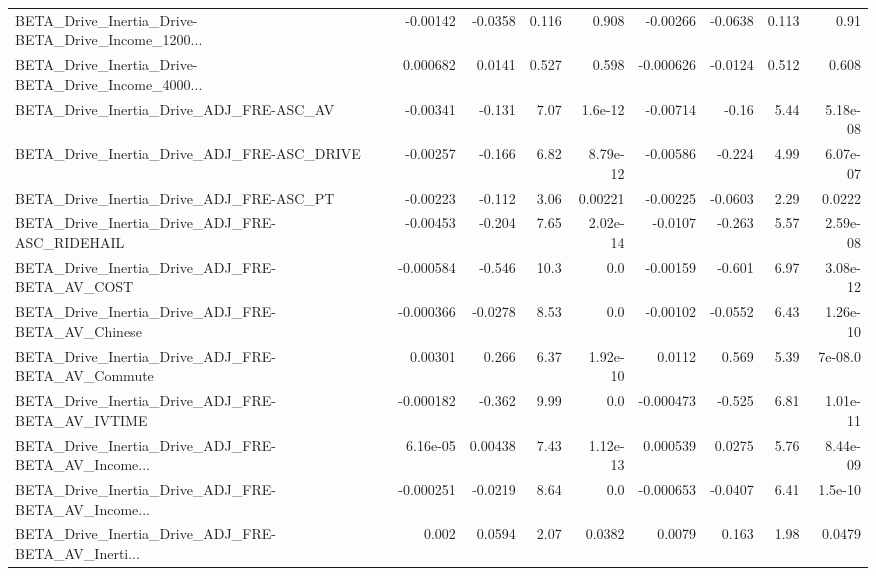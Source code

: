 \begin{tabular}{lrrrrrrrr}
BETA\_Drive\_Inertia\_Drive-BETA\_Drive\_Income\_1200... &    -0.00142 &      -0.0358 &    0.116 &    0.908 &   -0.00266 &     -0.0638 &        0.113 &          0.91 \\
BETA\_Drive\_Inertia\_Drive-BETA\_Drive\_Income\_4000... &    0.000682 &       0.0141 &    0.527 &    0.598 &  -0.000626 &     -0.0124 &        0.512 &         0.608 \\
BETA\_Drive\_Inertia\_Drive\_ADJ\_FRE-ASC\_AV            &    -0.00341 &       -0.131 &     7.07 &  1.6e-12 &   -0.00714 &       -0.16 &         5.44 &      5.18e-08 \\
BETA\_Drive\_Inertia\_Drive\_ADJ\_FRE-ASC\_DRIVE         &    -0.00257 &       -0.166 &     6.82 & 8.79e-12 &   -0.00586 &      -0.224 &         4.99 &      6.07e-07 \\
BETA\_Drive\_Inertia\_Drive\_ADJ\_FRE-ASC\_PT            &    -0.00223 &       -0.112 &     3.06 &  0.00221 &   -0.00225 &     -0.0603 &         2.29 &        0.0222 \\
BETA\_Drive\_Inertia\_Drive\_ADJ\_FRE-ASC\_RIDEHAIL      &    -0.00453 &       -0.204 &     7.65 & 2.02e-14 &    -0.0107 &      -0.263 &         5.57 &      2.59e-08 \\
BETA\_Drive\_Inertia\_Drive\_ADJ\_FRE-BETA\_AV\_COST      &   -0.000584 &       -0.546 &     10.3 &      0.0 &   -0.00159 &      -0.601 &         6.97 &      3.08e-12 \\
BETA\_Drive\_Inertia\_Drive\_ADJ\_FRE-BETA\_AV\_Chinese   &   -0.000366 &      -0.0278 &     8.53 &      0.0 &   -0.00102 &     -0.0552 &         6.43 &      1.26e-10 \\
BETA\_Drive\_Inertia\_Drive\_ADJ\_FRE-BETA\_AV\_Commute   &     0.00301 &        0.266 &     6.37 & 1.92e-10 &     0.0112 &       0.569 &         5.39 &       7e-08.0 \\
BETA\_Drive\_Inertia\_Drive\_ADJ\_FRE-BETA\_AV\_IVTIME    &   -0.000182 &       -0.362 &     9.99 &      0.0 &  -0.000473 &      -0.525 &         6.81 &      1.01e-11 \\
BETA\_Drive\_Inertia\_Drive\_ADJ\_FRE-BETA\_AV\_Income... &    6.16e-05 &      0.00438 &     7.43 & 1.12e-13 &   0.000539 &      0.0275 &         5.76 &      8.44e-09 \\
BETA\_Drive\_Inertia\_Drive\_ADJ\_FRE-BETA\_AV\_Income... &   -0.000251 &      -0.0219 &     8.64 &      0.0 &  -0.000653 &     -0.0407 &         6.41 &       1.5e-10 \\
BETA\_Drive\_Inertia\_Drive\_ADJ\_FRE-BETA\_AV\_Inerti... &       0.002 &       0.0594 &     2.07 &   0.0382 &     0.0079 &       0.163 &         1.98 &        0.0479 \\

\end{tabular}
